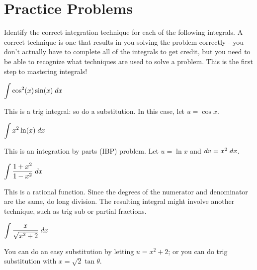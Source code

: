 \documentclass{ximera}
\theoremstyle{definition}
\begin{document}
\section*{Practice Problems}
Identify the correct integration technique for each of the following integrals. A correct technique is one that results in you solving the problem correctly - you don't actually have to complete all of the integrals to get credit, but you need to be able to recognize what techniques are used to solve a problem. This is the first step to mastering integrals!

\begin{problem}
$\displaystyle \int \cos^2(x) \sin(x) \; dx$
\begin{multipleChoice}
\end{multipleChoice}
\begin{feedback}[correct]
This is a trig integral: so do a substitution. In this case, let $u = \cos x$.
\end{feedback}
\end{problem}
\begin{problem}
$\displaystyle \int x^2 \ln(x) \; dx$
\begin{multipleChoice}
\end{multipleChoice}
\begin{feedback}[correct]
This is an integration by parts (IBP) problem. Let $u=\ln x$ and $dv = x^2 \; dx$.
\end{feedback}
\end{problem}
\begin{problem}
$\displaystyle \int \displaystyle\frac{1+x^2}{1-x^2} \; dx$
\begin{multipleChoice}
\end{multipleChoice}
\begin{feedback}[correct]
This is a rational function. Since the degrees of the numerator and denominator are the same, do long division. The resulting integral might involve another technique, such as trig sub or partial fractions.
\end{feedback}
\end{problem}
\begin{problem}
$\displaystyle \int \displaystyle\frac{x}{\sqrt{x^2 + 2}} \; dx$
\begin{multipleChoice}
\end{multipleChoice}
\begin{feedback}[correct]
You can do an easy substitution by letting $u = x^2 + 2$; or you can do trig substitution with $x=\sqrt{2}\tan \theta$.
\end{feedback}
\end{problem}
\end{document}
